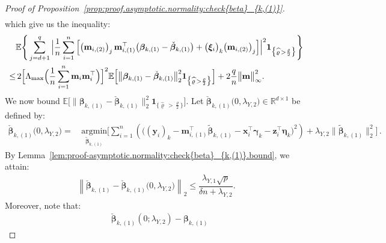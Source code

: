 \documentclass[
  12pt]{article}
\def\R{\mathbb{R}}
\def\E{\mathbb{E}}
\def\M{\mathbf{m}}
\def\X{\mathbf{x}}
\def\Y{\mathbf{y}}
\def\Z{\mathbf{z}}
\begin{document}
\begin{proof}[Proof of Proposition~\ref{prop:proof.asymptotic.normality:check{beta}_{k,(1)}}]
\begin{align*}
	\end{align*}
	which give us the inequality:
	\begin{align}  
		&\E \Bigg\{  \sum_{j=d+1}^{q}  \Big| \dfrac{1}{n}   \sum_{i=1}^{n} \Big[  \big( \M_{i,(2)}   \big)_{j}  \,   \M_{i,(1)}^{\top}  \big( \bm{\beta}_{k,(1)}  - \check{\bm{\beta}}_{k,(1)} \big)    +     \big( \bm{\xi}_{i}   \big)_{k}     \big( \M_{i,(2)}  \big)_{j}      \Big]   \Big|^{2}
		\mathbf{1}_{ \big\{ \widehat{ \varrho } \, > \frac{\varrho}{2} \big\} }  \Bigg\}  
		\nonumber   
		\\
		\leq  &  \,    2 \Big[  \Lambda_{\max} \Big( \dfrac{1}{n} \sum_{i = 1}^{n}  \M_{i} \M_{i}^{\top}  \Big) \Big]^{2}   \E \Big[ \big\|  \bm{\beta}_{k,(1)}  - \check{\bm{\beta}}_{k,(1)}  \big\|_{2}^{2}   \mathbf{1}_{ \big\{ \widehat{ \varrho } \, > \frac{\varrho}{2} \big\} }   \Big]
		+ 2 \dfrac{q}{n}   \big\| \M \big\|_{\infty}^{2}       .  
		\label{proof:prop:proof.asymptotic.normality:check{beta}_{k,(1)}:bound2}
	\end{align}
	We now bound $\E \Big[ \big\|  \bm{\beta}_{k,(1)}  - \check{\bm{\beta}}_{k,(1)}  \big\|_{2}^{2}   \mathbf{1}_{ \big\{ \widehat{ \varrho } \, > \frac{\varrho}{2} \big\} }   \Big]$. Let  $  \check{\bm{\beta}}_{k,(1)} \big( 0 , \lambda_{Y,2} \big) \in \R^{d \times 1}$ be defined by:  
	\begin{align*}
		\check{\bm{\beta}}_{k,(1)} \big( 0 , \lambda_{Y,2} \big) = & \,  \underset{ \widetilde{\bm{\beta}}_{k,(1)}    }{\textrm{argmin}} 
		\Bigg[     \sum_{i=1}^{n}  \left(   \big(  (\Y_{i})_{k}   -     \M_{i,(1)} ^{\top}\widetilde{\bm{\beta}}_{k,(1)} -     \X_{i }^{\top}  \bm{\gamma}_{k}   -    \Z_{i }^{\top} \bm{\eta}_{k}     
		\big)^{2}   
		\right)   
		+  \lambda_{Y,2}  \big\|  \widetilde{ \bm{\beta}}_{k, (1)}   \big\|_{2}^{2}     \Bigg]  \,  .   
	\end{align*}
	By 
	Lemma~\ref{lem:proof-asymptotic.normality:check{beta}_{k,(1)}.bound}, we attain:  
	\begin{align}
		\left\| \check{\bm{\beta}}_{k,(1)} -  \check{\bm{\beta}}_{k,(1)} \big( 0 , \lambda_{Y,2} \big)  \right\|_{2}  \leq  
		\dfrac{ \lambda_{Y,1}  \sqrt{p} }{\delta n + \lambda_{Y,2} } .  
	\end{align}
	Moreover, note that:  
	\begin{align*}
		&\check{\bm{\beta}}_{k,(1)} ( 0 ; \lambda_{Y,2} ) - \bm{\beta}_{k,(1)}  

\end{align*}
\end{proof}
\end{document}
